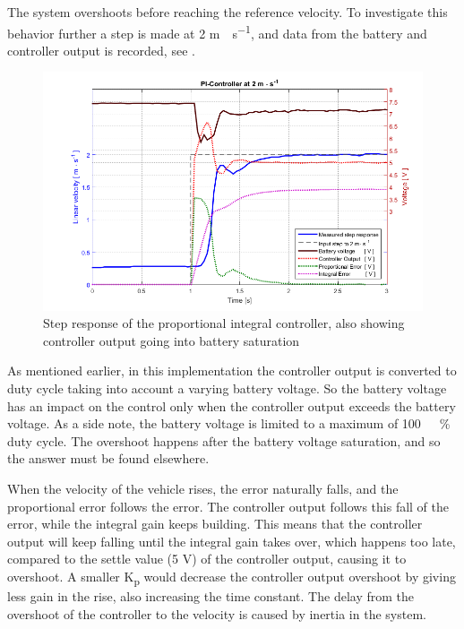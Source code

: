 %
The system overshoots before reaching the reference velocity. To investigate this behavior further a step is made at 2 \si{m\cdot s^{-1}}, and data from the battery and controller output is recorded, see .
%
\begin{figure}[H]
 	\centering
 	\includegraphics[width=.9\textwidth]{figures/PInoAntiWindup}
 	\caption{Step response of the proportional integral controller, also showing controller output going into battery saturation}
 	\label{fig:PInoAntiWindup}
\end{figure}
%
As mentioned earlier, in this implementation the controller output is converted to duty cycle taking into account a varying battery voltage. So the battery voltage has an impact on the control only when the controller output exceeds the battery voltage. As a side note, the battery voltage is limited to a maximum of \si{100 \ \%} duty cycle.
The overshoot happens after the battery voltage saturation, and so the answer must be found elsewhere.

When the velocity of the vehicle rises, the error naturally falls, and the proportional error follows the error. The controller output follows this fall of the error, while the integral gain keeps building. This means that the controller output will keep falling until the integral gain takes over, which happens too late, compared to the settle value (5 V) of the controller output, causing it to overshoot. A smaller \si{K_p} would decrease the controller output overshoot by giving less gain in the rise, also increasing the time constant.
The delay from the overshoot of the controller to the velocity is caused by inertia in the system.
%
